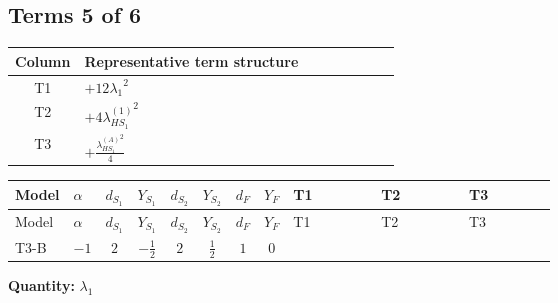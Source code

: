 \documentclass[8pt]{article}
\begin{document}
\begin{landscape}
\subsection*{Terms 5 of 6}
\begin{center}
\begin{tabular}{@{}c >{\raggedright\arraybackslash}p{0.82\linewidth}@{}}
\toprule
Column & Representative term structure \\
\midrule
T1 & \(\displaystyle +12 {\lambda_1}^2\) \\
\midrule
T2 & \(\displaystyle +4 {\lambda_{HS_1}^{(1)}}^2\) \\
\midrule
T3 & \(\displaystyle +\frac{{\lambda_{HS_1}^{(A)}}^2}{4}\) \\
\midrule
\bottomrule
\end{tabular}
\end{center}
\smallskip
\tiny
\begin{longtable}{@{}llcccccc >{\raggedright\arraybackslash}p{0.21\linewidth} >{\raggedright\arraybackslash}p{0.21\linewidth} >{\raggedright\arraybackslash}p{0.21\linewidth}@{}}
\toprule
Model & $\alpha$ & $d_{S_1}$ & $Y_{S_1}$ & $d_{S_2}$ & $Y_{S_2}$ & $d_F$ & $Y_F$ & T1 & T2 & T3 \\
\midrule
\endfirsthead
\toprule
Model & $\alpha$ & $d_{S_1}$ & $Y_{S_1}$ & $d_{S_2}$ & $Y_{S_2}$ & $d_F$ & $Y_F$ & T1 & T2 & T3 \\
\midrule
\endhead
T3-B & $-1$ & $2$ & $-\frac{1}{2}$ & $2$ & $\frac{1}{2}$ & $1$ & $0$ & \scriptsize\adjustbox{max width=\linewidth}{$\begin{gathered} +12 {\lambda_1}^2\end{gathered}$} & \scriptsize\adjustbox{max width=\linewidth}{$\begin{gathered} +4 {\lambda_{HS_1}^{(1)}}^2\end{gathered}$} & \scriptsize\adjustbox{max width=\linewidth}{$\begin{gathered} +\frac{{\lambda_{HS_1}^{(A)}}^2}{4}\end{gathered}$} \\
\midrule
\bottomrule
\end{longtable}
\clearpage
\noindent\textbf{Quantity: }$\lambda_1$\par\smallskip

\end{landscape}
\end{document}
